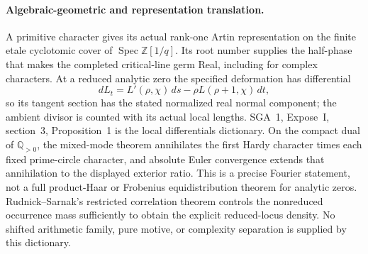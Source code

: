 \paragraph{Algebraic-geometric and representation translation.}
A primitive character gives its actual rank-one Artin representation
on the finite etale cyclotomic cover of
$\operatorname{Spec}\mathbb Z[1/q]$. Its root number supplies the
half-phase that makes the completed critical-line germ Real, including
for complex characters. At a reduced analytic zero the specified
deformation has differential
\[
 dL_t=L'(\rho,\chi)\,ds-\rho L(\rho+1,\chi)\,dt,
\]
so its tangent section has the stated normalized real normal
component; the ambient divisor is counted with its actual local
lengths. SGA~1, Expose~I, section~3, Proposition~1 is the local
differentials dictionary. On the compact dual of $\mathbb Q_{>0}$,
the mixed-mode theorem annihilates the first Hardy character times
each fixed prime-circle character, and absolute Euler convergence
extends that annihilation to the displayed exterior ratio. This is
a precise Fourier statement, not a full product-Haar or Frobenius
equidistribution theorem for analytic zeros. Rudnick--Sarnak's
restricted correlation theorem controls the nonreduced occurrence
mass sufficiently to obtain the explicit reduced-locus density.
No shifted arithmetic family, pure motive, or complexity separation
is supplied by this dictionary.

